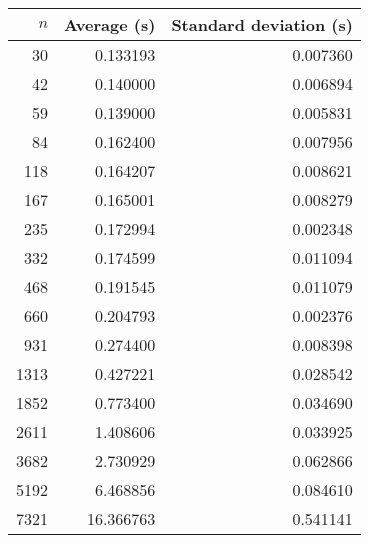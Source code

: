 \begin{tabular}{rrr}
$n$ & Average (s) & Standard deviation (s) \\\hline
30 & 0.133193 & 0.007360\\ 
42 & 0.140000 & 0.006894\\ 
59 & 0.139000 & 0.005831\\ 
84 & 0.162400 & 0.007956\\ 
118 & 0.164207 & 0.008621\\ 
167 & 0.165001 & 0.008279\\ 
235 & 0.172994 & 0.002348\\ 
332 & 0.174599 & 0.011094\\ 
468 & 0.191545 & 0.011079\\ 
660 & 0.204793 & 0.002376\\ 
931 & 0.274400 & 0.008398\\ 
1313 & 0.427221 & 0.028542\\ 
1852 & 0.773400 & 0.034690\\ 
2611 & 1.408606 & 0.033925\\ 
3682 & 2.730929 & 0.062866\\ 
5192 & 6.468856 & 0.084610\\ 
7321 & 16.366763 & 0.541141\\ 
\end{tabular}
